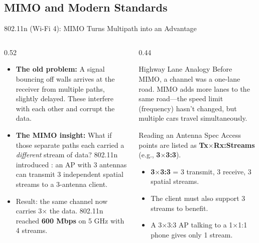 \documentclass[aspectratio=169]{beamer}
\begin{document}
\subsection{MIMO and Modern Standards}

\begin{frame}{802.11n (Wi-Fi 4): MIMO Turns Multipath into an Advantage}
    \begin{columns}[T]
        \begin{column}{0.52\textwidth}
            \footnotesize
            \begin{itemize}
                \item \textbf{The old problem:} A signal bouncing off walls arrives at the receiver from multiple paths, slightly delayed. These  interfere with each other and corrupt the data.
                \item \textbf{The MIMO insight:} What if those separate paths each carried a \emph{different} stream of data? 802.11n introduced : an AP with 3 antennas can transmit 3 independent spatial streams to a 3-antenna client.
                \item Result: the same channel now carries 3$\times$ the data. 802.11n reached \textbf{600 Mbps} on 5 GHz with 4 streams.
            \end{itemize}
        \end{column}
        \begin{column}{0.44\textwidth}
            \begin{exampleblock}{Highway Lane Analogy}
                \footnotesize
                Before MIMO, a channel was a one-lane road. MIMO adds more lanes to the same road---the speed limit (frequency) hasn't changed, but multiple cars travel simultaneously.
            \end{exampleblock}
            \vspace{0.3em}
            \begin{block}{Reading an Antenna Spec}
                \footnotesize
                Access points are listed as \textbf{Tx$\times$Rx:Streams} (e.g., \textbf{3$\times$3:3}).
                \begin{itemize}
                    \item \textbf{3$\times$3:3} = 3 transmit, 3 receive, 3 spatial streams.
                    \item The client must also support 3 streams to benefit.
                    \item A 3$\times$3:3 AP talking to a 1$\times$1:1 phone gives only 1 stream.
                \end{itemize}
            \end{block}
        \end{column}
    \end{columns}
\end{frame}
\end{document}
